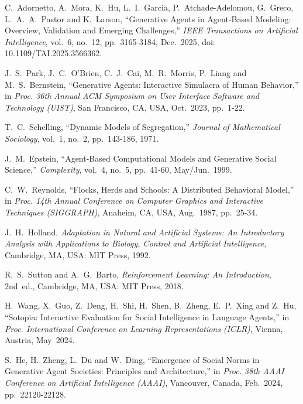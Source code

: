 \documentclass[12pt,a4paper]{report}
\begin{document}
\begingroup
\fontsize{11}{14}\selectfont
\setlength{\parskip}{0pt}
\begin{enumerate}[label={[\arabic*]}, itemsep=2pt, parsep=0pt, topsep=0pt, leftmargin=2em]

C.~Adornetto, A.~Mora, K.~Hu, L.~I.~Garcia, P.~Atchade-Adelomou, G.~Greco, L.~A.~A.~Pastor and K.~Larson,
``Generative Agents in Agent-Based Modeling: Overview, Validation and Emerging Challenges,''
\textit{IEEE Transactions on Artificial Intelligence}, vol.~6, no.~12, pp.~3165-3184, Dec.~2025, doi: 10.1109/TAI.2025.3566362.

J.~S.~Park, J.~C.~O'Brien, C.~J.~Cai, M.~R.~Morris, P.~Liang and M.~S.~Bernstein,
``Generative Agents: Interactive Simulacra of Human Behavior,''
in \textit{Proc. 36th Annual ACM Symposium on User Interface Software and Technology (UIST)}, San Francisco, CA, USA, Oct.~2023, pp.~1-22.

T.~C.~Schelling,
``Dynamic Models of Segregation,''
\textit{Journal of Mathematical Sociology}, vol.~1, no.~2, pp.~143-186, 1971.

J.~M.~Epstein,
``Agent-Based Computational Models and Generative Social Science,''
\textit{Complexity}, vol.~4, no.~5, pp.~41-60, May/Jun.~1999.

C.~W.~Reynolds,
``Flocks, Herds and Schools: A Distributed Behavioral Model,''
in \textit{Proc. 14th Annual Conference on Computer Graphics and Interactive Techniques (SIGGRAPH)}, Anaheim, CA, USA, Aug.~1987, pp.~25-34.

J.~H.~Holland,
\textit{Adaptation in Natural and Artificial Systems: An Introductory Analysis with Applications to Biology, Control and Artificial Intelligence},
Cambridge, MA, USA: MIT Press, 1992.

R.~S.~Sutton and A.~G.~Barto,
\textit{Reinforcement Learning: An Introduction},
2nd~ed., Cambridge, MA, USA: MIT Press, 2018.

H.~Wang, X.~Guo, Z.~Deng, H.~Shi, H.~Shen, B.~Zheng, E.~P.~Xing and Z.~Hu,
``Sotopia: Interactive Evaluation for Social Intelligence in Language Agents,''
in \textit{Proc. International Conference on Learning Representations (ICLR)}, Vienna, Austria, May~2024.

S.~He, H.~Zheng, L.~Du and W.~Ding,
``Emergence of Social Norms in Generative Agent Societies: Principles and Architecture,''
in \textit{Proc. 38th AAAI Conference on Artificial Intelligence (AAAI)}, Vancouver, Canada, Feb.~2024, pp.~22120-22128.


\end{enumerate}
\end{document}
